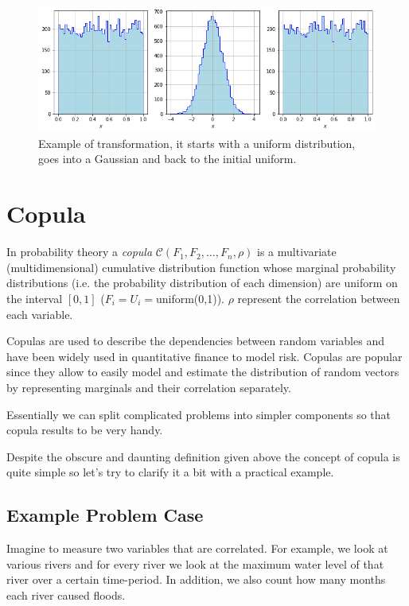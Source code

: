 \begin{figure}[htbp]
	\centering
	\includegraphics[width=1.\textwidth]{figures/lesson6_11_0.png}
	\caption{Example of transformation, it starts with a uniform distribution, goes into a Gaussian and back to the initial uniform.}
	\label{fig:a_to_b_to_a}
\end{figure}

\section{Copula}\label{copula}

In probability theory a \emph{copula} $\mathcal{C}(F_1, F_2, \ldots, F_n, \rho)$
is a multivariate (multidimensional) cumulative distribution function
whose marginal probability distributions (i.e. the probability
distribution of each dimension) are uniform on the
interval \([0, 1]\) (\(F_i = U_i =\)uniform(0,1)).
\(\rho\) represent the correlation between each variable.

Copulas are used to describe the dependencies between random variables and
have been widely used in quantitative finance to model risk. Copulas are popular since
they allow to easily model and estimate the distribution of random
vectors by representing marginals and their correlation separately.

Essentially we can split complicated problems into simpler components so that copula results to be very handy.

Despite the obscure and daunting definition given above the concept of copula is
quite simple so let's try to clarify it a bit with a practical example.

\subsection{Example Problem Case}\label{example-problem-case}

Imagine to measure two variables that are 
correlated. For example, we look at various rivers and for every river
we look at the maximum water level of that river over a certain
time-period. In addition, we also count how many months each river
caused floods.

